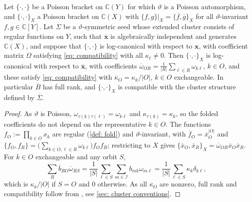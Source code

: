 \documentclass[a4paper]{amsart}
\numberwithin{equation}{section}
\theoremstyle{definition}
\theoremstyle{remark}
\newcommand{\bbC}{\mathbb{C}}
\newcommand{\mcI}{\mathcal{I}}
\newcommand{\bx}{\mathbf{x}}
\newcommand{\vt}{\vartheta}
\begin{document}
\begin{proposition}
  \label{prop: fold compatible}
  Let $\{\cdot,\cdot\}$ be a Poisson bracket on $\bbC(Y)$ for which $\vt$ is a Poisson automorphism, and $\{\cdot,\cdot\}_X$ a Poisson bracket on $\bbC(X)$ with $\{f,g\}|_X=\{\overline{f},\overline{g}\}_X$ for all $\vt$-invariant $f,g\in\bbC[Y]$.
  Let $\Sigma$ be a $\vt$-symmetric seed whose extended cluster consists of regular functions on $Y$, such that $\overline{\bx}$ is algebraically independent and generates $\bbC(X)$, and suppose that $\{\cdot,\cdot\}$ is log-canonical with respect to $\bx$, with coefficient matrix $\Omega$ satisfying \eqref{eq: compatibility} with all $\kappa_\ell\neq0$.
  Then $\{\cdot,\cdot\}_X$ is log-canonical with respect to $\overline{\bx}$, with coefficients $\overline{\omega}_{OR}=\frac1{|R|}\sum_{\ell\in R}\omega_{k\ell}$, $k\in O$, and these satisfy \eqref{eq: compatibility} with $\overline{\kappa}_O=\kappa_k/|O|$, $k\in O$ exchangeable.
  In particular $\overline{B}$ has full rank, and $\{\cdot,\cdot\}_X$ is compatible with the cluster structure defined by $\overline{\Sigma}$.
\end{proposition}
\begin{proof}

  As $\vt$ is Poisson, $\omega_{\tau(k)\tau(\ell)}=\omega_{k\ell}$ and $\kappa_{\tau(k)}=\kappa_k$, so the folded coefficients do not depend on the representative $k\in O$.
  The functions $f_O:=\prod_{k\in O}x_k$ are regular (\cref{def: fold}) and $\vt$-invariant, with $\overline{f}_O=\overline{x}_O^{|O|}$ and $\{f_O,f_R\}=\big(\sum_{k\in O,\ell\in R}\omega_{k\ell}\big)f_Of_R$; restricting to $X$ gives $\{\overline{x}_O,\overline{x}_R\}_X=\overline{\omega}_{OR}\overline{x}_O\overline{x}_R$.
  For $k\in O$ exchangeable and any orbit $S$,
  \[
    \sum_R\overline{b}_{RO}\overline{\omega}_{RS}=\frac1{|S|}\sum_{\ell\in S}\sum_{m\in\mcI}b_{mk}\omega_{m\ell}=\frac1{|S|}\sum_{\ell\in S}\kappa_k\delta_{k\ell},
  \]
  which is $\kappa_k/|O|$ if $S=O$ and $0$ otherwise.
  As all $\overline{\kappa}_O$ are nonzero, full rank and compatibility follow from \cite[Proposition~2.5]{GSV18dd}, see \cref{sec: cluster conventions}.
\end{proof}
\end{document}
